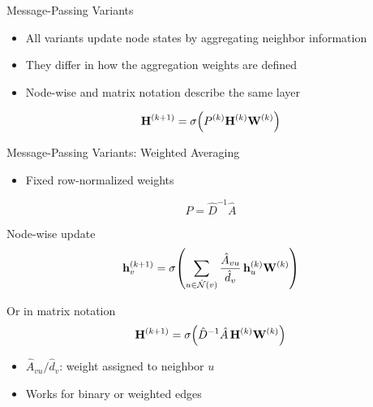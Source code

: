 \documentclass[10pt,aspectratio=169]{ntuabeamer}
\begin{document}

\begin{frame}{Message-Passing Variants}
  \begin{itemize}
    \item All variants update node states by aggregating neighbor information
    \item They differ in how the aggregation weights are defined
    \item Node-wise and matrix notation describe the same layer
  \end{itemize}

  \[
    \mathbf{H}^{(k+1)} =
    \sigma\!\left(P^{(k)} \mathbf{H}^{(k)} \mathbf{W}^{(k)}\right)
  \]
\end{frame}

\begin{frame}{Message-Passing Variants: Weighted Averaging}
  \begin{itemize}
    \item Fixed row-normalized weights
  \end{itemize}
  \[
    P = \hat{D}^{-1}\hat{A}
  \]

  \textcolor{ntuablue}{Node-wise update}
  \[
    \mathbf{h}_{v}^{(k+1)} =
    \sigma\!\left(
      \sum_{u \in \hat{\mathcal N}(v)}
      \frac{\hat{A}_{vu}}{\hat{d}_{v}} \,
      \mathbf{h}_{u}^{(k)} \mathbf{W}^{(k)}
    \right)
  \]

  \textcolor{ntuablue}{Or in matrix notation}
  \[
    \mathbf{H}^{(k+1)} =
    \sigma\!\left(
      \hat{D}^{-1}\hat{A}\,\mathbf{H}^{(k)} \mathbf{W}^{(k)}
    \right)
  \]

  \begin{itemize}
    \item \(\hat{A}_{vu} / \hat{d}_v\): weight assigned to neighbor \(u\)
    \item Works for binary or weighted edges
  \end{itemize}
\end{frame}
\end{document}
